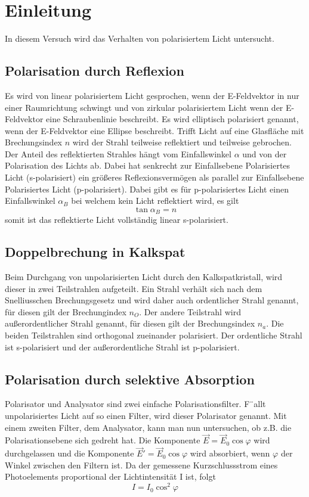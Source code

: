 \section{Einleitung}
In diesem Versuch wird das Verhalten von polarisiertem Licht untersucht.
\subsection{Polarisation durch Reflexion}
Es wird von linear polarisiertem Licht gesprochen, wenn der E-Feldvektor in nur einer Raumrichtung schwingt und von zirkular polarisiertem Licht wenn der E-Feldvektor eine Schraubenlinie beschreibt. Es wird elliptisch polarisiert genannt, wenn der E-Feldvektor eine Ellipse beschreibt.
Trifft Licht auf eine Glasfläche mit Brechungsindex $ n $ wird der Strahl teilweise reflektiert und teilweise gebrochen. Der Anteil des reflektierten Strahles hängt vom Einfallswinkel $ \alpha $ und von der Polarisation des Lichts ab.
Dabei hat senkrecht zur Einfallsebene Polarisiertes Licht (s-polarisiert) ein größeres Reflexionsvermögen als parallel zur Einfallsebene Polarisiertes Licht (p-polarisiert).
Dabei gibt es für p-polarisiertes Licht einen Einfallswinkel $ \alpha_{B} $ bei welchem kein Licht reflektiert wird, es gilt
\begin{equation}
\tan \alpha_{B} = n
\end{equation}
somit ist das reflektierte Licht vollständig linear s-polarisiert.
\subsection{Doppelbrechung in Kalkspat}
Beim Durchgang von unpolarisierten Licht durch den Kalkspatkristall, wird dieser in zwei Teilstrahlen aufgeteilt.
Ein Strahl verhält sich nach dem Snelliusschen Brechungsgesetz und wird daher auch ordentlicher Strahl genannt, für diesen gilt der Brechungindex $ n_{O} $. Der andere Teilstrahl wird außerordentlicher Strahl genannt, für diesen gilt der Brechungsindex $ n_{a} $. Die beiden Teilstrahlen sind orthogonal zueinander polarisiert. Der ordentliche Strahl ist s-polarisiert und der außerordentliche Strahl ist p-polarisiert.
\subsection{Polarisation durch selektive Absorption}
Polarisator und Analysator sind zwei einfache Polarisationsfilter. F¨allt unpolarisiertes
Licht auf so einen Filter, wird dieser Polarisator genannt. Mit einem
zweiten Filter, dem Analysator, kann man nun untersuchen, ob z.B. die Polarisationsebene
sich gedreht hat. Die Komponente $\vec E = \vec E_0 \cos\varphi$ wird durchgelassen und die Komponente $\vec E' = \vec E_0 \cos\varphi$ wird absorbiert, wenn $\varphi$ der Winkel zwischen den Filtern ist. Da der gemessene Kurzschlussstrom eines Photoelements proportional der Lichtintensität I ist, folgt
\begin{equation}
I = I_0 \cos^2\varphi
\end{equation}
